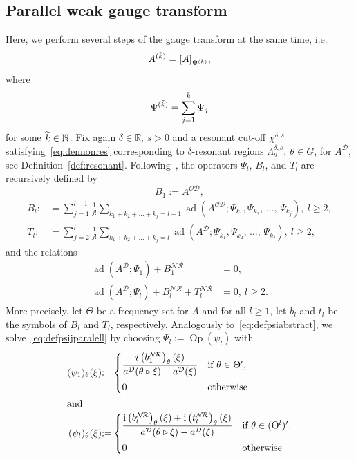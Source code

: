 \documentclass[10pt]{amsart}
\theoremstyle{definition}\newtheorem{defi}[theo]{Definition}\newtheorem{rema}[theo]{Remark}\newtheorem{exam}[theo]{Example}\newtheorem{nota}[theo]{Notation}
\DeclareMathOperator{\ad}{ad}
\DeclareMathOperator{\Op}{Op}
\newcommand{\rmi}{\mathrm{i}}
\newcommand{\R}{\mathbb R}
\newcommand{\N}{\mathbb N}
\newcommand{\CD}{\mathcal{D}}
\newcommand{\CN}{\mathcal{N}}
\newcommand{\CO}{\mathcal{O}}
\newcommand{\CR}{\mathcal{R}}
\newcommand{\COD}{{\CO\CD}}
\newcommand{\CNR}{{\CN\!\CR}}
\newcommand{\rco}{\chi}
\newcommand{\act}{\triangleright}
\let\oldtilde\tilde
\renewcommand*{\tilde}[1]{\mathchoice{\widetilde{#1}}{\widetilde{#1}}{\oldtilde{#1}}{\oldtilde{#1}}}
\begin{document}
\subsection{Parallel weak gauge transform} Here, we perform several steps of the gauge transform at the same time, i.e.
\begin{equation}
A^{(\tilde k)}=[A]_{\Psi^{(\tilde{k})}},
\end{equation}
where
\begin{equation}
\Psi^{(\tilde k)}=\sum\limits_{j=1}^{\tilde{k}}\Psi_j
\end{equation}
for some $\tilde{k}\in\N$. Fix again $\delta\in\R$, $s>0$ and a resonant cut-off $\rco^{\delta,s}$ satisfying~\eqref{eq:dennonres} corresponding to $\delta$-resonant regions $\Lambda_\theta^{\delta,s},\ \theta\in G$, for $A^{\CD}$, see Definition~\ref{def:resonant}. Following~\cite[Section~9]{ParSht2012}, the operators $\Psi_l$, $B_l$, and $T_l$ are recursively defined by
\begin{equation}\label{eq:defb1}
B_1:=A^\COD,
\end{equation}
\begin{equation}\label{eq:defbltl}
\begin{split}
B_l:&=\sum\limits_{j=1}^{l-1}\frac{1}{j!}\sum\limits_{k_1+k_2+\dots +k_j=l-1}\ad\left(A^\COD;\Psi_{k_1},\Psi_{k_2},\,\dots,\,\Psi_{k_j}\right),\ l\geq 2,\\
T_l:&=\sum\limits_{j=2}^l\frac{1}{j!}\sum\limits_{k_1+k_2+\dots +k_j=l}\ad\left(A^\CD;\Psi_{k_1},\Psi_{k_2},\,\dots,\,\Psi_{k_j}\right),\ l\geq 2,
\end{split}
\end{equation}
and the relations
\begin{equation}\label{eq:defpsijparalell}
\begin{split}
\ad\left(A^\CD;\Psi_1\right)+B_1^{\CNR}&=0,\\
\ad\left(A^\CD;\Psi_l\right)+B_l^{\CNR}+T_l^{\CNR}&=0, \ l\geq 2.
\end{split}
\end{equation}
More precisely, let $\Theta$ be a frequency set for $A$ and for all $l\geq 1$, let $b_l$ and $t_l$ be the symbols of $B_l$ and $T_l$, respectively. Analogously to~\eqref{eq:defpsiabstract}, we solve~\eqref{eq:defpsijparalell} by choosing $\Psi_l:=\Op(\psi_l)$ with
\begin{align}
(\psi_1)_\theta(\xi)&{:=}
\begin{cases}\dfrac{i\left(b_1^\CNR\right)_\theta(\xi)}{a^\CD(\theta\act\xi)-a^\CD(\xi)}&
\text{if } \theta\in\Theta',\\[2ex] 0 & \text{otherwise}
\end{cases}
\\
\intertext{and}
(\psi_l)_\theta(\xi) &{:=}
\begin{cases}\dfrac{\rmi\left(b_l^\CNR\right)_\theta(\xi)+\rmi\left(t_l^{\CNR}\right)_\theta(\xi)}{a^\CD(\theta\act\xi)-a^\CD(\xi)}&
\text{if } \theta\in(\Theta^l)',\\[2ex] 0 & \text{otherwise}
\end{cases}
\end{align}
\end{document}
